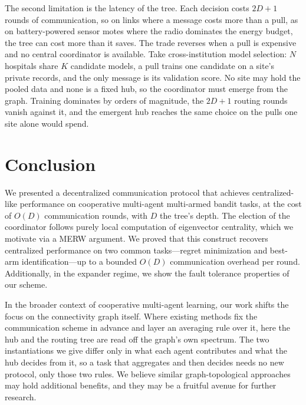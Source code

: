 \documentclass[letterpaper]{article} %
\begin{document}
The second limitation is the latency of the tree. Each decision costs $2D+1$
rounds of communication, so on links where a message costs more than a pull, as
on battery-powered sensor motes where the radio dominates the energy budget, the
tree can cost more than it saves. The trade reverses when a pull is expensive and
no central coordinator is available. Take cross-institution model selection: $N$
hospitals share $K$ candidate models, a pull trains one candidate on a site's
private records, and the only message is its validation score. No site may hold
the pooled data and none is a fixed hub, so the coordinator must emerge from the
graph. Training dominates by orders of magnitude, the $2D+1$ routing rounds
vanish against it, and the emergent hub reaches the same choice on the pulls one
site alone would spend.

\section{Conclusion}
\label{sec:conclusion}

We presented a decentralized communication protocol that achieves
centralized-like performance on cooperative multi-agent multi-armed bandit
tasks, at the cost of $O(D)$ communication rounds, with $D$ the tree's depth.
The election of the coordinator follows purely local computation of eigenvector
centrality, which we motivate via a MERW argument. We proved that this
construct recovers centralized performance on two common tasks---regret
minimization and best-arm identification---up to a bounded $O(D)$ communication
overhead per round. Additionally, in the expander regime, we show the fault
tolerance properties of our scheme.

In the broader context of cooperative multi-agent learning, our work shifts the
focus on the connectivity graph itself. Where existing methods fix the
communication scheme in advance and layer an averaging rule over it, here the
hub and the routing tree are read off the graph's own spectrum. The
two instantiations we give differ only in what each agent contributes and what
the hub decides from it, so a task that aggregates and then decides needs no
new protocol, only those two rules. We believe similar graph-topological
approaches may hold additional benefits, and they may be a fruitful avenue for
further research.


\end{document}
